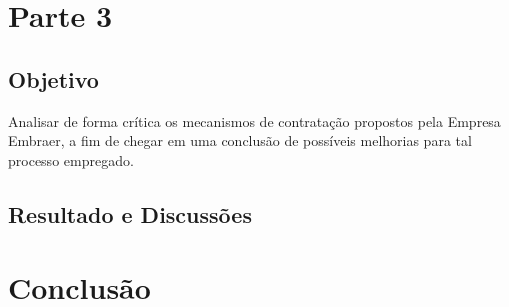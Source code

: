 \chapter{Parte 3}

\section{Objetivo}
Analisar de forma crítica os mecanismos de contratação propostos pela Empresa Embraer, a fim de chegar em uma conclusão de possíveis
melhorias para tal processo empregado. 

\section{Resultado e Discussões}
\chapter{Conclusão}